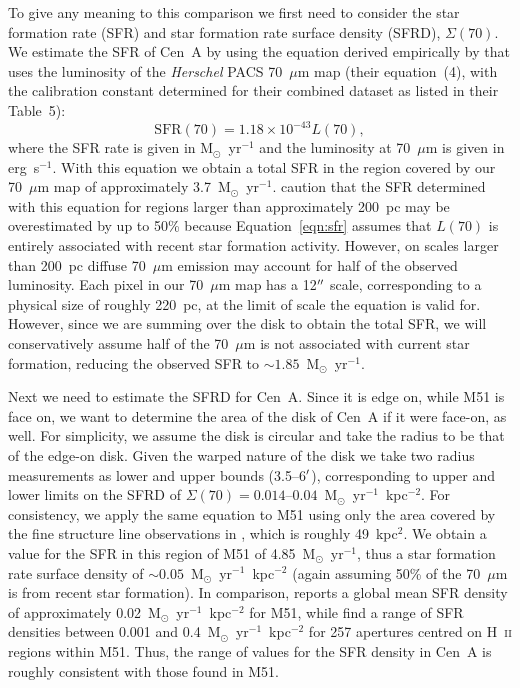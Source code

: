 To give any meaning to this comparison we first need to consider the star formation rate (SFR) and star formation rate surface density (SFRD), $\Sigma(70)$.  We estimate the SFR of Cen~A by using the equation derived empirically by \citet{2013ApJ...768..180L} that uses the luminosity of the \emph{Herschel} PACS 70~$\mu$m map (their equation~(4), with the calibration constant determined for their combined dataset as listed in their Table~5):
\begin{equation}\label{eqn:sfr}
\mathrm{SFR}(70) = 1.18 \times 10^{-43} L(70),
\end{equation}
where the SFR rate is given in M$_{\odot}$~yr$^{-1}$ and the luminosity at 70~$\mu$m is given in erg~s$^{-1}$.  With this equation we obtain a total SFR in the region covered by our 70~$\mu$m map of approximately 3.7~M$_{\odot}$~yr$^{-1}$.   \citet{2013ApJ...768..180L} caution that the SFR determined with this equation for regions larger than approximately 200~pc may be overestimated by up to 50\% because Equation~\ref{eqn:sfr} assumes that $L(70)$ is entirely associated with recent star formation activity.  However, on scales larger than 200~pc diffuse 70~$\mu$m emission may account for half of the observed luminosity.  Each pixel in our 70~$\mu$m map has a 12$\mbox{$^{\prime\prime}$}$ scale, corresponding to a physical size of roughly 220~pc, at the limit of scale the equation is valid for.  However, since we are summing over the disk to obtain the total SFR, we will conservatively assume half of the 70~$\mu$m is not associated with current star formation, reducing the observed SFR to $\sim1.85$~M$_{\odot}$~yr$^{-1}$.

Next we need to estimate the SFRD for Cen~A.  Since it is edge on, while M51 is face on, we want to determine the area of the disk of Cen~A if it were face-on, as well.  For simplicity, we assume the disk is circular and take the radius to be that of the edge-on disk.  Given the warped nature of the disk we take two radius measurements as lower and upper bounds (3.5--6$\mbox{$^\prime$}$), corresponding to upper and lower limits on the SFRD of $\Sigma(70) = 0.014$--$0.04$~M$_{\odot}$~yr$^{-1}$~kpc$^{-2}$.  For consistency, we apply the same equation to M51 using only the area covered by the fine structure line observations in \citet{parkin_2013}, which is roughly 49~kpc$^{2}$.  We obtain a value for the SFR in this region of M51 of 4.85~M$_{\odot}$~yr$^{-1}$, thus a star formation rate surface density of $\sim 0.05$~M$_{\odot}$~yr$^{-1}$~kpc$^{-2}$ (again assuming 50\% of the 70~$\mu$m is from recent star formation).   In comparison, \citet{1998ApJ...498..541K} reports a global mean SFR density of approximately 0.02~M$_{\odot}$~yr$^{-1}$~kpc$^{-2}$ for M51, while \citet{2007ApJ...671..333K} find a range of SFR densities between 0.001 and 0.4~M$_{\odot}$~yr$^{-1}$~kpc$^{-2}$ for 257 apertures centred on H~\textsc{ii} regions within M51.  Thus, the range of values for the SFR density in Cen~A is roughly consistent with those found in M51.

